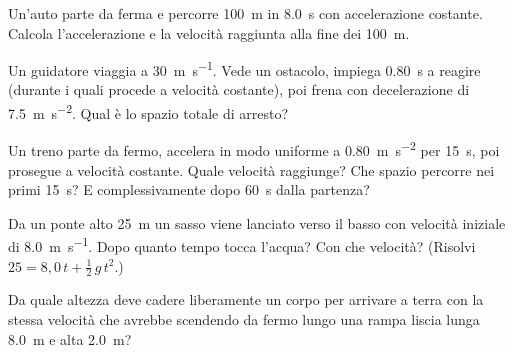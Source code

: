 \begin{esercizio}
Un'auto parte da ferma e percorre \SI{100}{\metre} in \SI{8,0}{\second} con accelerazione costante. Calcola l'accelerazione e la velocità raggiunta alla fine dei \SI{100}{\metre}.\\
\end{esercizio}

\begin{esercizio}
Un guidatore viaggia a \SI{30}{\metre\per\second}. Vede un ostacolo, impiega \SI{0,80}{\second} a reagire (durante i quali procede a velocità costante), poi frena con decelerazione di \SI{7,5}{\metre\per\second\squared}. Qual è lo spazio totale di arresto?\\
\end{esercizio}

\begin{esercizio}
Un treno parte da fermo, accelera in modo uniforme a \SI{0,80}{\metre\per\second\squared} per \SI{15}{\second}, poi prosegue a velocità costante. Quale velocità raggiunge? Che spazio percorre nei primi \SI{15}{\second}? E complessivamente dopo \SI{60}{\second} dalla partenza?\\
\end{esercizio}

\begin{esercizio}
Da un ponte alto \SI{25}{\metre} un sasso viene lanciato verso il basso con velocità iniziale di \SI{8,0}{\metre\per\second}. Dopo quanto tempo tocca l'acqua? Con che velocità? (Risolvi $25 = 8{,}0\,t + \tfrac{1}{2}\,g\,t^2$.)\\
\end{esercizio}

\begin{esercizio}
Da quale altezza deve cadere liberamente un corpo per arrivare a terra con la stessa velocità che avrebbe scendendo da fermo lungo una rampa liscia lunga \SI{8,0}{\metre} e alta \SI{2,0}{\metre}?\\
\end{esercizio}
